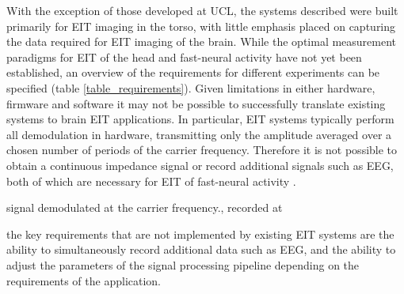 With the exception of those developed at UCL, the systems described were built primarily for EIT imaging in the torso, with little emphasis placed on capturing the data required for EIT imaging of the brain. While the optimal measurement paradigms for EIT of the head and fast-neural activity have not yet been established, an overview of the requirements for different experiments can be specified (table \ref{table_requirements}). Given limitations in either hardware, firmware and software it may not be possible to successfully translate existing systems to brain EIT applications. In particular, EIT systems typically perform all demodulation in hardware, transmitting only the amplitude averaged over a chosen number of periods of the carrier frequency. Therefore it is not possible to obtain a continuous impedance signal or record additional signals such as EEG, both of which are necessary for EIT of fast-neural activity  \cite{Aristovich_2016}. 



signal demodulated at the carrier frequency.,  recorded at 


the key requirements that are not implemented by existing EIT systems are the ability to simultaneously record additional data such as EEG, and the ability to adjust the parameters of the signal processing pipeline depending on the requirements of the application.